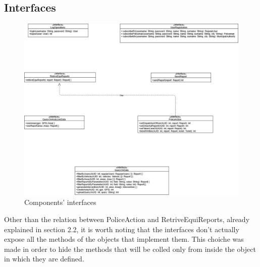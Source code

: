 \subsection{Interfaces}
\begin{figure}[h!]
	\centering
	\includegraphics[width=\textwidth]{Images/interface_diagram}
	\caption{Components' interfaces}
\end{figure}
Other than the relation between PoliceAction and RetriveEquiReports, already explained in section 2.2, it is worth noting that the interfaces don't actually expose all the methods of the objects that implement them. This choiche was made in order to hide the methods that will be colled only from inside the object in which they are defined. 

